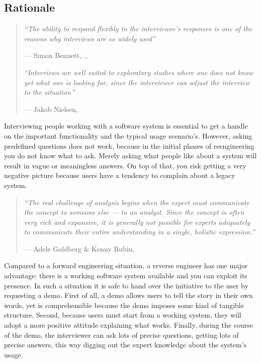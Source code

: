 \documentclass[a4paper,10pt,twoside]{book}
\begin{document}
\subsection*{Rationale}

\begin{quotation}
\noindent
\emph{``The ability to respond flexibly to the interviewee's responses is one of the reasons why interviews are so widely used''}

\hfill --- Simon Bennett, \etal., \cite{Benn99a}

\noindent
\emph{``Interviews are well suited to exploratory studies where one does not know yet what one is looking for, since the interviewer can adjust the interview to the situation''}

\hfill --- Jakob Nielsen, \cite{Niel93b}
\end{quotation}

Interviewing people working with a software system is essential to get a handle on the important functionality and the typical usage scenario's. However, asking predefined questions does not work, because in the initial phases of reengineering you do not know what to ask. Merely asking what people like about a system will result in vague or meaningless answers. On top of that, you risk getting a very negative picture because users have a tendency to complain about a legacy system. 

\begin{quotation}
\noindent
\emph{``The real challenge of analysis begins when the expert must communicate the concept to someone else --- to an analyst. Since the concept is often very rich and expansive, it is generally not possible for experts adequately to communicate their entire understanding in a single, holistic expression.''}

\hfill --- Adele Goldberg \& Kenny Rubin, \cite{Gold95a}
\end{quotation}

Compared to a forward engineering situation, a reverse engineer has one major advantage: there is a working software system available and you can exploit its presence. In such a situation it is safe to hand over the initiative to the user by requesting a demo. First of all, a demo allows users to tell the story in their own words, yet is comprehensible because the demo imposes some kind of tangible structure. Second, because users must start from a working system, they will adopt a more positive attitude explaining what works. Finally, during the course of the demo, the interviewer can ask lots of precise questions, getting lots of precise answers, this way digging out the expert knowledge about the system's usage.
\end{document}
